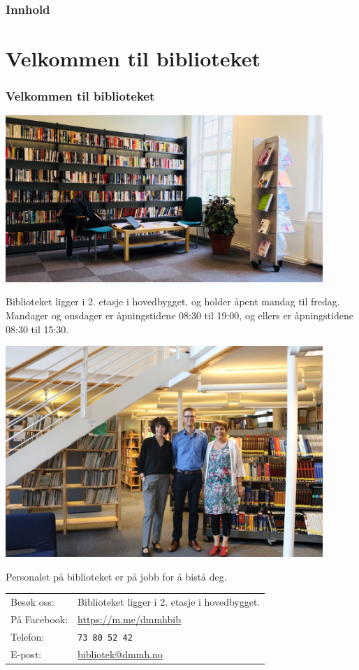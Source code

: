 \frame{\titlepage}
\begin{frame}
  \frametitle{Innhold}
  \tableofcontents
\end{frame}

\section{Velkommen til biblioteket}
\begin{frame}
  \frametitle{Velkommen til biblioteket}
  \centering
  \includegraphics[width=0.90\textwidth]{../media/nytt-bibliotek.png}
\end{frame}
\begin{frame}
  Biblioteket ligger i 2. etasje i hovedbygget, og holder åpent mandag til fredag. Mandager og onsdager er åpningstidene \alert{08:30 til 19:00}, og ellers er åpningstidene \alert{08:30 til 15:30}.
\end{frame}
\begin{frame}
  \centering
  \includegraphics[width=0.90\textwidth]{../media/bibliotekansatte.jpg}
\end{frame}
\begin{frame}
  Personalet på biblioteket er på jobb for å bistå deg.

  \vfill
  \begin{tabular}{ l | l }
    Besøk oss: & Biblioteket ligger i 2. etasje i hovedbygget. \\
    På Facebook: & \url{https://m.me/dmmhbib} \\
    Telefon: & \texttt{73 80 52 42} \\
    E-post: & \href{mailto:bibliotek@dmmh.no}{bibliotek@dmmh.no}
  \end{tabular}
\end{frame}

